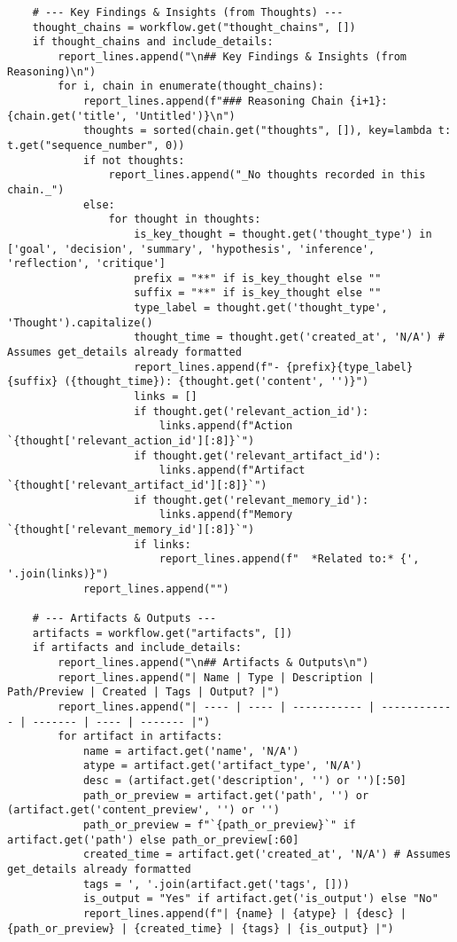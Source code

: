 \documentclass[12pt,a4paper]{article}
\begin{document}
\begin{pageablecode}
\begin{verbatim}
    # --- Key Findings & Insights (from Thoughts) ---
    thought_chains = workflow.get("thought_chains", [])
    if thought_chains and include_details:
        report_lines.append("\n## Key Findings & Insights (from Reasoning)\n")
        for i, chain in enumerate(thought_chains):
            report_lines.append(f"### Reasoning Chain {i+1}: {chain.get('title', 'Untitled')}\n")
            thoughts = sorted(chain.get("thoughts", []), key=lambda t: t.get("sequence_number", 0))
            if not thoughts: 
                report_lines.append("_No thoughts recorded in this chain._")
            else:
                for thought in thoughts:
                    is_key_thought = thought.get('thought_type') in ['goal', 'decision', 'summary', 'hypothesis', 'inference', 'reflection', 'critique']
                    prefix = "**" if is_key_thought else ""
                    suffix = "**" if is_key_thought else ""
                    type_label = thought.get('thought_type', 'Thought').capitalize()
                    thought_time = thought.get('created_at', 'N/A') # Assumes get_details already formatted
                    report_lines.append(f"- {prefix}{type_label}{suffix} ({thought_time}): {thought.get('content', '')}")
                    links = []
                    if thought.get('relevant_action_id'):
                        links.append(f"Action `{thought['relevant_action_id'][:8]}`")
                    if thought.get('relevant_artifact_id'): 
                        links.append(f"Artifact `{thought['relevant_artifact_id'][:8]}`")
                    if thought.get('relevant_memory_id'):
                        links.append(f"Memory `{thought['relevant_memory_id'][:8]}`")
                    if links:
                        report_lines.append(f"  *Related to:* {', '.join(links)}")
            report_lines.append("")

    # --- Artifacts & Outputs ---
    artifacts = workflow.get("artifacts", [])
    if artifacts and include_details:
        report_lines.append("\n## Artifacts & Outputs\n")
        report_lines.append("| Name | Type | Description | Path/Preview | Created | Tags | Output? |")
        report_lines.append("| ---- | ---- | ----------- | ------------ | ------- | ---- | ------- |")
        for artifact in artifacts:
            name = artifact.get('name', 'N/A')
            atype = artifact.get('artifact_type', 'N/A')
            desc = (artifact.get('description', '') or '')[:50]
            path_or_preview = artifact.get('path', '') or (artifact.get('content_preview', '') or '')
            path_or_preview = f"`{path_or_preview}`" if artifact.get('path') else path_or_preview[:60]
            created_time = artifact.get('created_at', 'N/A') # Assumes get_details already formatted
            tags = ', '.join(artifact.get('tags', []))
            is_output = "Yes" if artifact.get('is_output') else "No"
            report_lines.append(f"| {name} | {atype} | {desc} | {path_or_preview} | {created_time} | {tags} | {is_output} |")


\end{verbatim}
\end{pageablecode}
\end{document}
